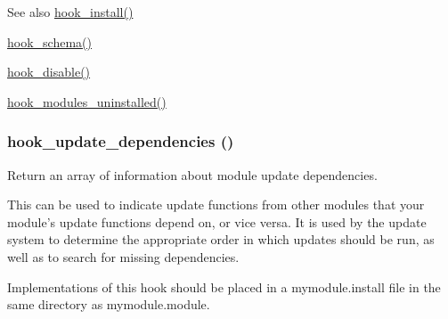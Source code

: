 \begin{DoxySeeAlso}{See also}
\hyperlink{group__hooks_ga1ecdb5a2a046ea63dc790c3ed90338e5}{hook\_\-install()} 

\hyperlink{group__schemaapi_ga9abd926ddaf68a22e6dca28a25d0c6f5}{hook\_\-schema()} 

\hyperlink{group__hooks_ga5872573d2180aa4b306e7d6c08a74c10}{hook\_\-disable()} 

\hyperlink{group__hooks_ga4f29c7343438068a922459cbe0810279}{hook\_\-modules\_\-uninstalled()} 
\end{DoxySeeAlso}
\hypertarget{group__hooks_ga23e9e019b7ec64d95bafbeaffd295483}{
\subsubsection[{hook\_\-update\_\-dependencies}]{\setlength{\rightskip}{0pt plus 5cm}hook\_\-update\_\-dependencies ()}}
\label{group__hooks_ga23e9e019b7ec64d95bafbeaffd295483}
Return an array of information about module update dependencies.

This can be used to indicate update functions from other modules that your module's update functions depend on, or vice versa. It is used by the update system to determine the appropriate order in which updates should be run, as well as to search for missing dependencies.

Implementations of this hook should be placed in a mymodule.install file in the same directory as mymodule.module.

